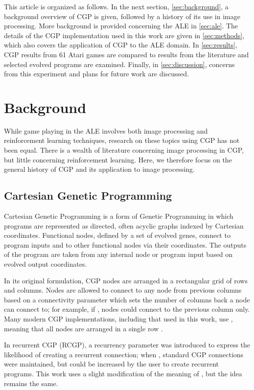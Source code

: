 \documentclass[sigconf,screen]{acmart}\settopmatter{printfolios=true,printacmref=false}
\begin{document}
This article is organized as follows. In the next section,
\autoref{sec:background}, a background overview of CGP is given, followed by a
history of its use in image processing. More background is provided concerning
the ALE in \autoref{sec:ale}. The details of the CGP implementation used in this
work are given in \autoref{sec:methods}, which also covers the application of
CGP to the ALE domain. In \autoref{sec:results}, CGP results from 61 Atari games
are compared to results from the literature and selected evolved programs are
examined. Finally, in \autoref{sec:discussion}, concerns from this experiment
and plans for future work are discussed.
 \section{Background}
\label{sec:background}

While game playing in the ALE involves both image processing and reinforcement
learning techniques, research on these topics using CGP has not been equal.
There is a wealth of literature concerning image processing in CGP, but little
concerning reinforcement learning. Here, we therefore focus on the general
history of CGP and its application to image processing.

\subsection{Cartesian Genetic Programming}

Cartesian Genetic Programming \cite{Miller2000} is a form of Genetic Programming
in which programs are represented as directed, often acyclic graphs indexed by
Cartesian coordinates. Functional nodes, defined by a set of evolved genes,
connect to program inputs and to other functional nodes via their coordinates.
The outputs of the program are taken from any internal node or program input
based on evolved output coordinates.

In its original formulation, CGP nodes are arranged in a rectangular grid of 
rows and  columns. Nodes are allowed to connect to any node from previous
columns based on a connectivity parameter  which sets the number of columns
back a node can connect to; for example, if , nodes could connect to the
previous column only. Many modern CGP implementations, including that used in
this work, use , meaning that all nodes are arranged in a single row
\cite{Miller2011a}.

In recurrent CGP \cite{Turner2014} (RCGP), a recurrency parameter was introduced
to express the likelihood of creating a recurrent connection; when ,
standard CGP connections were maintained, but  could be increased by the user
to create recurrent programs. This work uses a slight modification of the
meaning of , but the idea remains the same.
\end{document}
